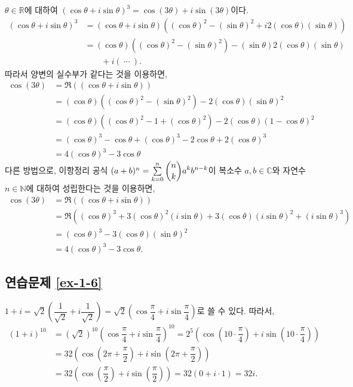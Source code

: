 $\theta\in\mathbb R$에 대하여
$(\cos\theta + i\sin\theta)^3 = \cos(3\theta) + i\sin(3\theta)$이다.
\begin{align*}
(\cos\theta + i\sin\theta)^3 
&= (\cos\theta + i\sin\theta)\left(
(\cos\theta)^2 - (\sin\theta)^2 + i2(\cos\theta)(\sin\theta) \right) \\
&= (\cos\theta)\left( (\cos\theta)^2 - (\sin\theta)^2 \right)
- (\sin\theta)2(\cos\theta)(\sin\theta)  \\
&\quad\quad + i(\ \cdots\ ).
\end{align*}
따라서 양변의 실수부가 같다는 것을 이용하면,
\begin{align*}
\cos(3\theta) &= \Re((\cos\theta + i\sin\theta)) \\
&=(\cos\theta)\left( (\cos\theta)^2 - (\sin\theta)^2 \right)
- 2(\cos\theta)(\sin\theta)^2 \\
&= (\cos\theta)\left( (\cos\theta)^2 - 1 + (\cos\theta)^2 \right)
- 2(\cos\theta)(1-\cos\theta)^2 \\
&= (\cos\theta)^3 - \cos\theta  + (\cos\theta)^3 - 2\cos\theta + 2(\cos\theta)^3 \\
&= 4(\cos\theta)^3 - 3\cos\theta
\end{align*}
다른 방법으로, 이항정리 공식
$(a+b)^n = \sum\limits_{k=0}^n \displaystyle{n \choose k} a^kb^{n-k}$이
복소수 $a,b \in \mathbb C$와 자연수 $n\in \mathbb N$에 대하여
성립한다는 것을 이용하면,
\begin{align*}
\cos(3\theta) &= \Re((\cos\theta + i\sin\theta)) \\
&= \Re ( (\cos\theta)^3 + 3(\cos\theta)^2(i\sin\theta) 
+ 3(\cos\theta)(i\sin\theta)^2 + (i\sin\theta)^3) \\
&= (\cos\theta)^3 - 3(\cos\theta)(\sin\theta)^2 \\
&= 4(\cos\theta)^3 - 3\cos\theta.
\end{align*}

\subsection*{연습문제 \ref{ex-1-6}}

$1+i = \sqrt{2}\left(\dfrac1{\sqrt{2}} + i\dfrac1{\sqrt{2}}\right)
= \sqrt{2}\left( \cos\dfrac\pi4 + i\sin \dfrac\pi4 \right)$로 쓸 수 있다.
따라서,
\begin{align*}
(1+i)^{10}
&= (\sqrt{2})^{10} \left( \cos\dfrac\pi4 + i\sin \dfrac\pi4 \right)^{10}
= 2^5 \left( \cos\left(10\cdot \dfrac\pi4\right) 
+ i\sin \left(10\cdot \dfrac\pi4\right) \right) \\
&= 32 \left( \cos\left(2\pi+\dfrac\pi2\right) 
+ i\sin \left(2\pi+\dfrac\pi2\right) \right) \\
&=32 \left( \cos\left(\dfrac\pi2\right) + i\sin \left(\dfrac\pi2\right) \right) 
= 32(0+i\cdot 1) = 32i.
\end{align*}

